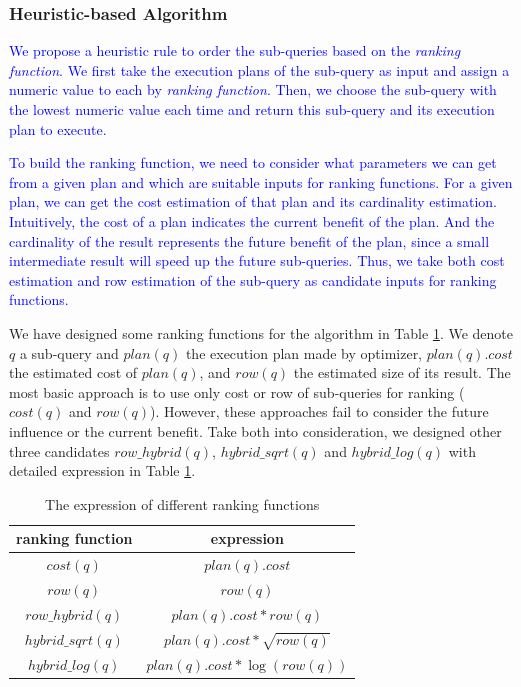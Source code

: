     \subsubsection{Heuristic-based Algorithm} \label{S421}
\textcolor{blue}{
    We propose a heuristic rule to order the sub-queries based on the \textit{ranking function}. We first take the execution plans of the sub-query as input and assign a numeric value to each by \textit{ranking function}. Then, we choose the sub-query with the lowest numeric value each time and return this sub-query and its execution plan to execute.
}\par
\textcolor{blue}{
    To build the ranking function, we need to consider what parameters we can get from a given plan and which are suitable inputs for ranking functions. For a given plan, we can get the cost estimation of that plan and its cardinality estimation. Intuitively, the cost of a plan indicates the current benefit of the plan. And the cardinality of the result represents the future benefit of the plan, since a small intermediate result will speed up the future sub-queries. Thus, we take both cost estimation and row estimation of the sub-query as candidate inputs for ranking functions.
}\par
    We have designed some ranking functions for the algorithm in Table \ref{T2}. We denote $q$ a sub-query and $plan(q)$ the execution plan made by optimizer, $plan(q).cost$ the estimated cost of $plan(q)$, and $row(q)$ the estimated size of its result. The most basic approach is to use only cost or row of sub-queries for ranking ($cost(q)$ and $row(q)$). However, these approaches fail to consider the future influence or the current benefit. Take both into consideration, we designed other three candidates $row\_hybrid(q)$, $hybrid\_sqrt(q)$ and $hybrid\_log(q)$ with detailed expression in Table \ref{T2}.
    \begin{table}[htb]
        \caption{The expression of different ranking functions}
        \label{T2}
        \begin{tabular}{c|c}
            \toprule
            ranking function  & expression                   \\
            \midrule
            $cost(q)$         & $plan(q).cost$               \\
            $row(q)$          & $row(q)$                     \\
            $row\_hybrid(q)$  & $plan(q).cost*row(q)$        \\
            $hybrid\_sqrt(q)$ & $plan(q).cost*\sqrt{row(q)}$ \\
            $hybrid\_log(q)$  & $plan(q).cost*\log(row(q))$  \\
            \bottomrule
        \end{tabular}
    \end{table}  
        

